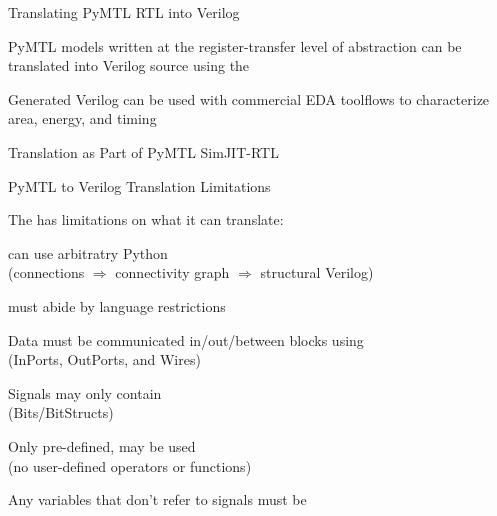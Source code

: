 \begin{frame}{Translating PyMTL RTL into Verilog}

\begin{cbxlist}

  \1 PyMTL models written at the register-transfer level of abstraction
     can be translated into Verilog source using the 

  \1 Generated Verilog can be used with commercial EDA toolflows to
    characterize area, energy, and timing

\end{cbxlist}

\vspace{0.3in}

\end{frame}

\begin{frame}{Translation as Part of PyMTL SimJIT-RTL}

  \vspace{0.2in}

\end{frame}

\begin{frame}{PyMTL to Verilog Translation Limitations}

{}The  has limitations on what it can translate:

\medskip
\begin{cbxlist}[ll]

  \1  can use arbitratry Python \\ (connections
        $\Rightarrow$ connectivity graph $\Rightarrow$ structural
        Verilog)

  \1  must abide by language restrictions

  \pause

    \2 Data must be communicated in/out/between blocks using  \\
       (InPorts, OutPorts, and Wires)

    \2 Signals may only contain  \\
       (Bits/BitStructs)

    \2 Only pre-defined,  may be
       used \\ (no user-defined operators or functions)

    \2 Any variables that don't refer to signals must be 

\end{cbxlist}
\end{frame}

